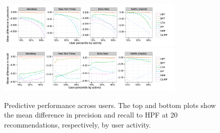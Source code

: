\begin{figure}[t!]
\centering
\includegraphics[width=0.8\textwidth]{newfigs/mean_diff_precision_at_20_by_user_percentile.pdf}\\
\includegraphics[width=0.8\textwidth]{newfigs/mean_diff_recall_at_20_by_user_percentile.pdf}\\
\caption{Predictive performance across users. The top and bottom plots show the
  mean difference in precision and recall to HPF at 20 recommendations,
  respectively, by user activity.}
\label{fig:precision_recall_by_user_activity}
\end{figure}

